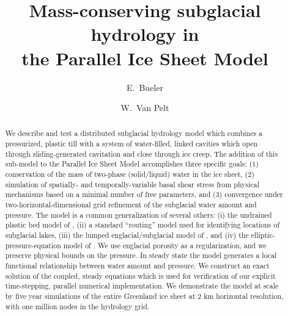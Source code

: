 \documentclass[gmd]{copernicus}   %
\begin{document}
\graphicspath{{figs/}}

\linenumbers

\title{Mass-conserving subglacial hydrology in \\ the Parallel Ice Sheet Model}


\author[1]{E.~Bueler}
\author[2]{W.~Van Pelt}





\received{}
\pubdiscuss{} %
\revised{}
\accepted{}
\published{}


\maketitle

\begin{abstract}
We describe and test a distributed subglacial hydrology model which combines a pressurized, plastic till with a system of water-filled, linked cavities which open through sliding-generated cavitation  and close through ice creep.  The addition of this sub-model to the Parallel Ice Sheet Model accomplishes three specific goals: (1) conservation of the mass of two-phase (solid/liquid) water in the ice sheet, (2) simulation of spatially- and temporally-variable basal shear stress from physical mechanisms based on a minimal number of free parameters, and (3) convergence under two-horizontal-dimensional grid refinement of the subglacial water amount and pressure.  The model is a common generalization of several others: (i) the undrained plastic bed model of \cite{Tulaczyketal2000b}, (ii) a standard ``routing'' model used for identifying locations of subglacial lakes, (iii) the lumped englacial/subglacial model of \citep{Bartholomausetal2011}, and (iv) the elliptic-pressure-equation model of \cite{Schoofetal2012}.  We use englacial porosity as a regularization, and we preserve physical bounds on the pressure.  In steady state the model generates a local functional relationship between water amount and pressure.  We construct an exact solution of the coupled, steady equations which is used for verification of our explicit time-stepping, parallel numerical implementation.  We demonstrate the model at scale by five year simulations of the entire Greenland ice sheet at 2 km horizontal resolution, with one million nodes in the hydrology grid.
\end{abstract}
\end{document}
